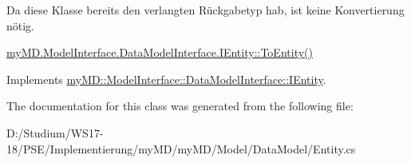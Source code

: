 Da diese Klasse bereits den verlangten R\"{u}ckgabetyp hab, ist keine Konvertierung n\"{o}tig. 

\hyperlink{interfacemy_m_d_1_1_model_interface_1_1_data_model_interface_1_1_i_entity_1a8b26c73ec083d6930f1f39ce916df3}{my\-MD.Model\-Interface.Data\-Model\-Interface.IEntity::To\-Entity()} 

Implements \hyperlink{interfacemy_m_d_1_1_model_interface_1_1_data_model_interface_1_1_i_entity_1a8b26c73ec083d6930f1f39ce916df3}{my\-MD::Model\-Interface::Data\-Model\-Interface::IEntity}.

The documentation for this class was generated from the following file:\begin{CompactItemize}
\item 
D:/Studium/WS17-18/PSE/Implementierung/my\-MD/my\-MD/Model/Data\-Model/Entity.cs\end{CompactItemize}
